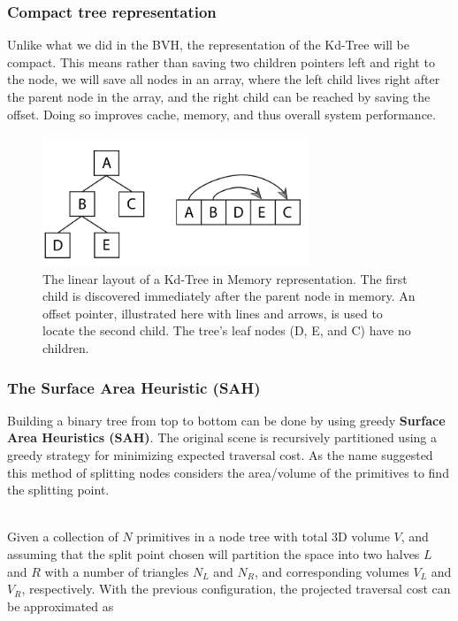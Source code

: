 \documentclass[11pt,a4paper]{article}
\begin{document}
\subsubsection{Compact tree representation}
Unlike what we did in the BVH, the representation of the Kd-Tree will be compact. This means rather than saving two children pointers left and right to the node, we will save all nodes in an array, where the left child lives right after the parent node in the array, and the right child can be reached by saving the offset. Doing so improves cache, memory, and thus overall system performance.


\begin{figure}[h]	
     \centering
     \captionsetup{justification=centering,margin=2cm}
     \includegraphics[width=8cm]{images/kdtree/compact.png}
     \caption{The linear layout of a Kd-Tree in Memory representation. The first child is discovered immediately after the parent node in memory. An offset pointer, illustrated here with lines and arrows, is used to locate the second child. The tree's leaf nodes (D, E, and C) have no children. \protect\cite{Pharr2016}}
        \label{fig:dice}
\end{figure}


\subsubsection{The Surface Area Heuristic (SAH)}
Building a binary tree from top to bottom can be done by using greedy \textbf{Surface Area Heuristics (SAH)}. The original scene is recursively partitioned using a greedy strategy for minimizing expected traversal cost. As the name suggested this method of splitting nodes considers the area/volume of the primitives to find the splitting point.

\noindent
\\
Given a collection of $N$ primitives in a node tree with total 3D volume $V$, and assuming that the split point chosen will partition the space into two halves $L$ and $R$ with a number of triangles $N_L$ and $N_R$, and corresponding volumes $V_L$ and $V_R$, respectively. With the previous configuration, the projected traversal cost can be approximated as
\end{document}
